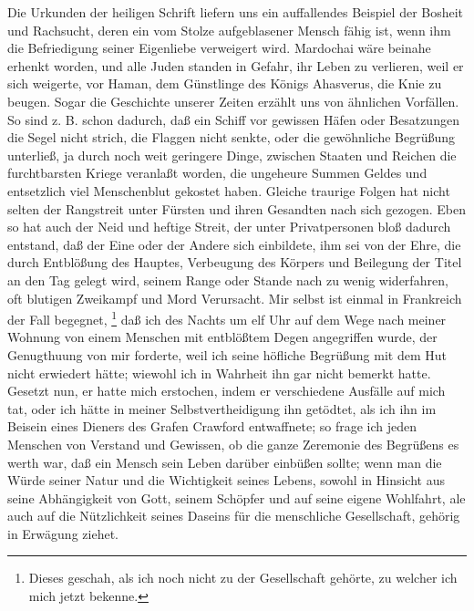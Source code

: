 Die Urkunden der heiligen Schrift liefern uns ein auffallendes Beispiel der
Bosheit und Rachsucht, deren ein vom Stolze aufgeblasener Mensch fähig ist, wenn
ihm die Befriedigung seiner Eigenliebe verweigert wird. Mardochai wäre beinahe
erhenkt worden, und alle Juden standen in Gefahr, ihr Leben zu verlieren, weil
er sich weigerte, vor Haman, dem Günstlinge des Königs Ahasverus, die Knie zu
beugen. Sogar die Geschichte unserer Zeiten erzählt uns von ähnlichen Vorfällen.
So sind z. B. schon dadurch, daß ein Schiff vor gewissen Häfen oder Besatzungen
die Segel nicht strich, die Flaggen nicht senkte, oder die gewöhnliche Begrüßung
unterließ, ja durch noch weit geringere Dinge, zwischen Staaten und Reichen die
furchtbarsten Kriege veranlaßt worden, die ungeheure Summen Geldes und
entsetzlich viel Menschenblut gekostet haben. Gleiche traurige Folgen hat nicht
selten der Rangstreit unter Fürsten und ihren Gesandten nach sich gezogen. Eben
so hat auch der Neid und heftige Streit, der unter Privatpersonen bloß dadurch
entstand, daß der Eine oder der Andere sich einbildete, ihm sei von der Ehre,
die durch Entblößung des Hauptes, Verbeugung des Körpers und Beilegung der Titel
an den Tag gelegt wird, seinem Range oder Stande nach zu wenig widerfahren, oft
blutigen Zweikampf und Mord Verursacht. Mir selbst ist einmal in Frankreich
der Fall begegnet,
\footnote{Dieses geschah, als ich noch nicht zu der
Gesellschaft gehörte, zu welcher ich mich jetzt bekenne.}
 daß ich des Nachts um
elf Uhr auf dem Wege nach meiner Wohnung von einem Menschen mit entblößtem Degen
angegriffen wurde, der Genugthuung von mir forderte, weil ich seine höfliche
Begrüßung mit dem Hut nicht erwiedert hätte; wiewohl ich in Wahrheit ihn gar
nicht bemerkt hatte. Gesetzt nun, er hatte mich erstochen, indem er verschiedene
Ausfälle auf mich tat, oder ich hätte in meiner Selbstvertheidigung ihn
getödtet, als ich ihn im Beisein eines Dieners des Grafen Crawford
entwaffnete; so frage ich jeden Menschen von Verstand und Gewissen, ob die ganze
Zeremonie des Begrüßens es werth war, daß ein Mensch sein Leben darüber einbüßen
sollte; wenn man die Würde seiner Natur und die Wichtigkeit seines Lebens,
sowohl in Hinsicht aus seine Abhängigkeit von Gott, seinem Schöpfer und auf
seine eigene Wohlfahrt, ale auch auf die Nützlichkeit seines Daseins für die
menschliche Gesellschaft, gehörig in Erwägung ziehet.

